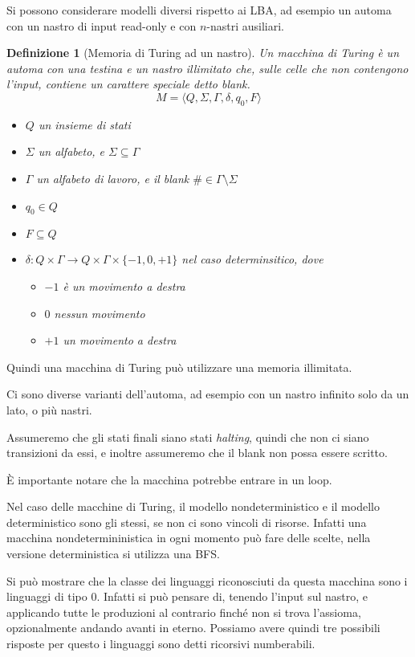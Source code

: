 \documentclass[12pt]{article}
\newtheorem{definizione}{Definizione}
\begin{document}
\tableofcontents
\newpage
Si possono considerare modelli diversi rispetto ai LBA, ad esempio un automa con un nastro di input read-only e con $n$-nastri ausiliari.

\begin{definizione}[Memoria di Turing ad un nastro]
	Un macchina di Turing è un automa con una testina e un nastro illimitato che, sulle celle che non contengono l'input, contiene un carattere speciale detto \textit{blank}.
	$$ M = \langle Q, \Sigma, \Gamma, \delta, q_0, F \rangle $$
	\begin{itemize}
		\item $Q$ un insieme di stati
		\item $\Sigma$ un alfabeto, e $\Sigma \subseteq \Gamma$
		\item $\Gamma$ un alfabeto di lavoro, e il blank $\# \in \Gamma \setminus \Sigma$
		\item $q_0 \in Q$
		\item $F \subseteq Q$
		\item $\delta : Q \times \Gamma \rightarrow Q \times \Gamma \times \{-1, 0, +1\} $ nel caso determinsitico,
			dove
			\begin{itemize}
				\item $-1$ è un movimento a destra
				\item $0$ nessun movimento
				\item $+1$ un movimento a destra
			\end{itemize}
	\end{itemize}
\end{definizione}
Quindi una macchina di Turing può utilizzare una memoria illimitata.

Ci sono diverse varianti dell'automa, ad esempio con un nastro infinito solo da un lato, o più nastri.

Assumeremo che gli stati finali siano stati \textit{halting}, quindi che non ci siano transizioni da essi, e inoltre assumeremo che il blank non possa essere scritto.

\`E importante notare che la macchina potrebbe entrare in un loop.

Nel caso delle macchine di Turing, il modello nondeterministico e il modello deterministico sono gli stessi, se non ci sono vincoli di risorse.
Infatti una macchina nondetermininistica in ogni momento può fare delle scelte, nella versione deterministica si utilizza una BFS.

Si può mostrare che la classe dei linguaggi riconosciuti da questa macchina sono i linguaggi di tipo 0.
Infatti si può pensare di, tenendo l'input sul nastro, e applicando tutte le produzioni al contrario finché non si trova l'assioma, opzionalmente andando avanti in eterno.
Possiamo avere quindi tre possibili risposte
per questo i linguaggi sono detti ricorsivi numberabili.
\end{document}
